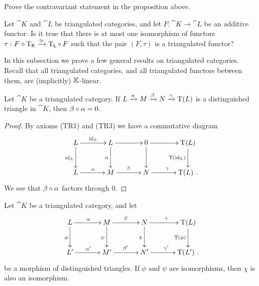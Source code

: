 \begin{exer} \label{exer:2301}
Prove the contravariant statement in the proposition above. 
\end{exer}

\begin{que} \label{eqn:1305}
Let  $\cat{K}$ and $\cat{L}$  be triangulated categories, and let 
$F : \cat{K} \to \cat{L}$ be an additive functor. Is it true that there is at 
most one isomorphism of functors 
$\tau :  F \circ \operatorname{T}_{\operatorname{\mathsf{K}}}  \xrightarrow{\simeq} \operatorname{T}_{\operatorname{\mathsf{L}}} \circ \, F$
such that the pair $(F, \tau)$ is a triangulated functor?
\end{que}




\label{subsec:props-tr-cats}

In this subsection we prove a few general results on triangulated categories. 
Recall that all triangulated categories, and all triangulated functors between 
them, are (implicitly) $\mathbb{K}$-linear.

\begin{prop} \label{prop:1280}
Let $\cat{K}$ be a triangulated category. If
$L \xrightarrow{\alpha} M \xrightarrow{\beta} N \xrightarrow{\gamma} \operatorname{T}(L)$
is a distinguished triangle
in $\cat{K}$, then $\beta \circ \alpha = 0$. 
\end{prop}

\begin{proof}
By axioms (TR1) and (TR3) we have a commutative diagram 
\[ \UseTips  \xymatrix @C=8ex @R=6ex { 
L
\ar[r]^{\opn{id}_L}
\ar[d]_{\opn{id}_L}
&
L
\ar[r]^{}
\ar[d]_{\al}
& 
0
\ar[r]^{}
\ar[d]_{}
&
\opn{T}(L)
\ar[d]_{\opn{T}(\opn{id}_L)}
\\
L
\ar[r]^{\al}
&
M
\ar[r]^{\be}
& 
N
\ar[r]^{\ga}
&
\opn{T}(L) \ .
}  \]
We see that $\beta \circ \alpha$ factors through $0$. 
\end{proof}

\begin{prop}  \label{prop:1283}
Let $\cat{K}$ be a triangulated category, and let 
\[ \UseTips  \xymatrix @C=8ex @R=6ex { 
L 
\ar[r]^{\al}
\ar[d]_{\phi}
&
M
\ar[r]^{\be}
\ar[d]_{\psi}
& 
N
\ar[r]^{\ga}
\ar[d]_{\chi}
&
\opn{T}(L)
\ar[d]_{\opn{T}(\phi)}
\\
L' 
\ar[r]^{\al'}
&
M'
\ar[r]^{\be'}
& 
N'
\ar[r]^{\ga'}
&
\opn{T}(L') \ .
}  \]
be a morphism of distinguished triangles. If $\phi$ and $\psi$ are isomorphisms,
then $\chi$ is also an isomorphism.
\end{prop}

